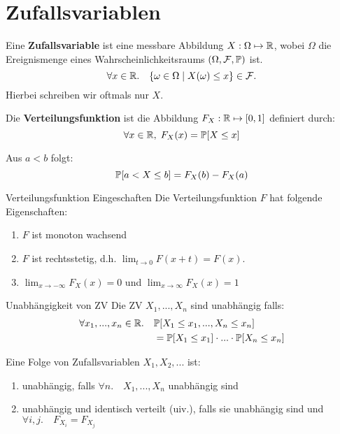 \section*{Zufallsvariablen}

Eine \textbf{Zufallsvariable} ist eine messbare Abbildung $X : \Omega \mapsto \mathbb{R}$, wobei $\Omega$ die Ereignismenge eines Wahrscheinlichkeitsraums $(\Omega, \mathcal{F}, \mathbb{P})$ ist.
$$\forall x \in \mathbb{R}. \quad \{\omega \in \Omega \; | \; X(\omega) \leq x\} \in \mathcal{F}.$$
Hierbei schreiben wir oftmals nur $X$.



Die \textbf{Verteilungsfunktion} ist die Abbildung $F_X:\mathbb{R} \mapsto [0,1]$ definiert durch:
$$\forall x \in \mathbb{R}, \; F_X(x) = \mathbb{P}[X \leq x]$$

\begin{mainbox}{} Aus $a < b$ folgt:
$$\mathbb{P}[a < X \leq b] = F_X(b) - F_X(a)$$ \end{mainbox}

\begin{subbox}{Verteilungsfunktion Eingeschaften}
Die Verteilungsfunktion $F$ hat folgende Eigenschaften:
\begin{enumerate}
    \item $F$ ist monoton wachsend
    \item $F$ ist rechtsstetig, d.h. $\lim_{t \to 0} F(x + t) = F(x)$.
    \item $\lim_{x \to - \infty}F_X(x) = 0$ und $\lim_{x \to \infty}F_X(x) = 1$
\end{enumerate}
\end{subbox}


\begin{mainbox}{Unabhängigkeit von ZV}
Die ZV $X_1,...,X_n$ sind unabhängig falls:
\begin{align*}
    \forall x_1,...,x_n \in \mathbb{R}. \quad &\mathbb{P}[X_1 \leq x_1, ..., X_n \leq x_n] \\ &= \mathbb{P}[X_1 \leq x_1] \cdot ... \cdot \mathbb{P}[X_n \leq x_n]
\end{align*}
\end{mainbox}

Eine Folge von Zufallsvariablen $X_1, X_2, ...$ ist:
\begin{enumerate}
    \item unabhängig, falls $\forall n. \quad  X_1,...,X_n$ unabhängig sind
    \item unabhängig und identisch verteilt (uiv.), falls sie unabhängig sind und $\forall i,j. \quad F_{X_i} = F_{X_j}$
\end{enumerate}


